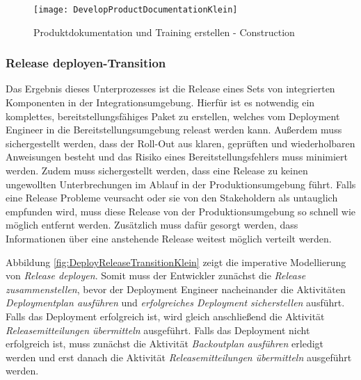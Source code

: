 \begin{figure}[!htbp]
\begin{center}
  \texttt{[image: DevelopProductDocumentationKlein]} %
  \caption{Produktdokumentation und Training erstellen - Construction}
  \label{fig:DevelopProductDocumentationKlein}
\end{center}
\end{figure}


\subsubsection{Release deployen-Transition}


Das Ergebnis dieses Unterprozesses ist die Release eines Sets von integrierten Komponenten in der Integrationsumgebung. \newline
Hierfür ist es notwendig ein komplettes, bereitstellungsfähiges Paket zu erstellen, welches vom Deployment Engineer in die Bereitstellungsumgebung releast werden kann.\newline
 Außerdem muss sichergestellt werden, dass der Roll-Out aus klaren, geprüften und wiederholbaren Anweisungen besteht und das Risiko eines Bereitstellungsfehlers muss minimiert werden. \newline
 Zudem muss sichergestellt werden, dass eine Release zu keinen ungewollten Unterbrechungen im Ablauf in der Produktionsumgebung führt. \newline
 Falls eine Release Probleme veursacht oder sie von den Stakeholdern als untauglich empfunden wird, muss diese Release von der Produktionsumgebung so schnell wie möglich entfernt werden. \newline
 Zusätzlich muss dafür gesorgt werden, dass Informationen über eine anstehende Release weitest möglich verteilt werden.\newline
 
  Abbildung \ref{fig:DeployReleaseTransitionKlein} zeigt die imperative Modellierung von \textit{Release deployen}.\newline
  Somit muss der Entwickler zunächst die \textit{Release zusammenstellen}, bevor der Deployment Engineer nacheinander die Aktivitäten \textit{Deploymentplan ausführen} und \textit{erfolgreiches Deployment sicherstellen} ausführt. Falls das Deployment erfolgreich ist, wird gleich anschließend die Aktivität \textit{Releasemitteilungen übermitteln} ausgeführt. Falls das Deployment nicht erfolgreich ist, muss zunächst die Aktivität \textit{Backoutplan ausführen} erledigt werden und erst danach die Aktivität \textit{Releasemitteilungen übermitteln} ausgeführt werden.


